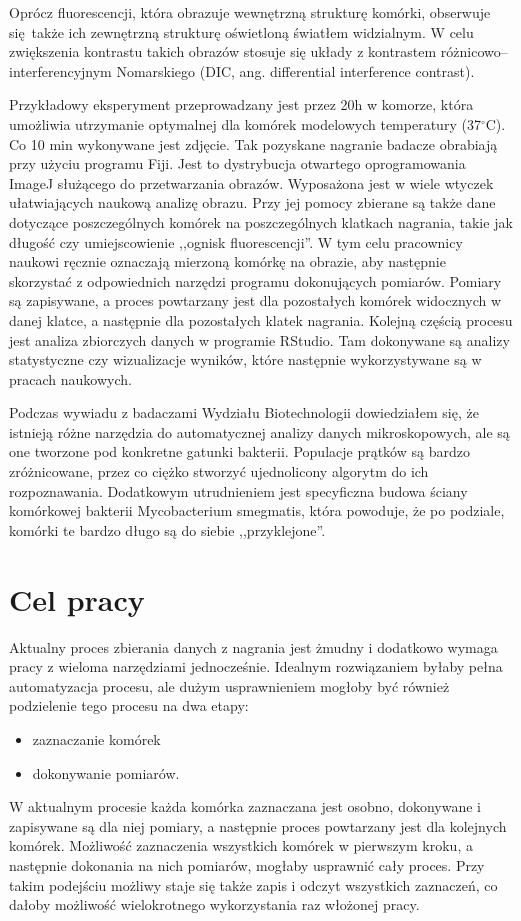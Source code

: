 \documentclass[declaration,shortabstract,mgr]{iithesis}
\begin{document}
Oprócz fluorescencji, która obrazuje wewnętrzną strukturę komórki, obserwuje się także ich zewnętrzną strukturę oświetloną światłem widzialnym.
W celu zwiększenia kontrastu takich obrazów stosuje się układy z kontrastem różnicowo--interferencyjnym Nomarskiego (DIC, ang. differential interference contrast).

Przykładowy eksperyment przeprowadzany jest przez 20h w komorze, która umożliwia utrzymanie optymalnej dla komórek modelowych temperatury (37$^{\circ}$C).
Co 10 min wykonywane jest zdjęcie.
Tak pozyskane nagranie badacze obrabiają przy użyciu programu Fiji\cite{imagej:fiji}.
Jest to dystrybucja otwartego oprogramowania ImageJ służącego do przetwarzania obrazów.
Wyposażona jest w wiele wtyczek ułatwiających naukową analizę obrazu.
Przy jej pomocy zbierane są także dane dotyczące poszczególnych komórek na poszczególnych klatkach nagrania, takie jak długość czy umiejscowienie ,,ognisk fluorescencji''.
W tym celu pracownicy naukowi ręcznie oznaczają mierzoną komórkę na obrazie, aby następnie skorzystać z odpowiednich narzędzi programu dokonujących pomiarów.
Pomiary są zapisywane, a proces powtarzany jest dla pozostałych komórek widocznych w danej klatce, a następnie dla pozostałych klatek nagrania.
Kolejną częścią procesu jest analiza zbiorczych danych w programie RStudio.
Tam dokonywane są analizy statystyczne czy wizualizacje wyników, które następnie wykorzystywane są w pracach naukowych.

Podczas wywiadu z badaczami Wydziału Biotechnologii dowiedziałem się, że istnieją różne narzędzia do automatycznej analizy danych mikroskopowych, ale są one tworzone pod konkretne gatunki bakterii.
Populacje prątków są bardzo zróżnicowane, przez co ciężko stworzyć ujednolicony algorytm do ich rozpoznawania.
Dodatkowym utrudnieniem jest specyficzna budowa ściany komórkowej bakterii Mycobacterium smegmatis, która powoduje, że po podziale, komórki te bardzo długo są do siebie ,,przyklejone''.

\section{Cel pracy}
\label{sec:target}

Aktualny proces zbierania danych z nagrania jest żmudny i dodatkowo wymaga pracy z wieloma narzędziami jednocześnie.
Idealnym rozwiązaniem byłaby pełna automatyzacja procesu, ale dużym usprawnieniem mogłoby być również podzielenie tego procesu na dwa etapy:
\begin{itemize}
  \item zaznaczanie komórek
  \item dokonywanie pomiarów.
\end{itemize}
W aktualnym procesie każda komórka zaznaczana jest osobno, dokonywane i zapisywane są dla niej pomiary, a następnie proces powtarzany jest dla kolejnych komórek.
Możliwość zaznaczenia wszystkich komórek w pierwszym kroku, a następnie dokonania na nich pomiarów, mogłaby usprawnić cały proces.
Przy takim podejściu możliwy staje się także zapis i odczyt wszystkich zaznaczeń, co dałoby możliwość wielokrotnego wykorzystania raz włożonej pracy.
\end{document}

